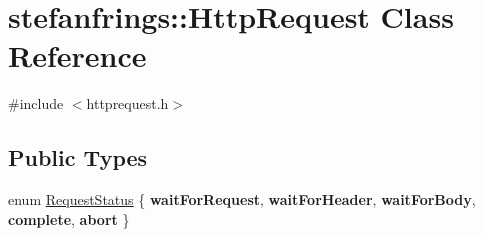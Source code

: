 \hypertarget{classstefanfrings_1_1_http_request}{}\section{stefanfrings\+:\+:Http\+Request Class Reference}
\label{classstefanfrings_1_1_http_request}


{\ttfamily \#include $<$httprequest.\+h$>$}

\subsection*{Public Types}
\begin{DoxyCompactItemize}
\item 
enum \mbox{\hyperlink{classstefanfrings_1_1_http_request_a45b0d7b99dbbb1b2c62afd8f51887995}{Request\+Status}} \{ \newline
{\bfseries wait\+For\+Request}, 
{\bfseries wait\+For\+Header}, 
{\bfseries wait\+For\+Body}, 
{\bfseries complete}, 
\newline
{\bfseries abort}
 \}
\end{DoxyCompactItemize}
